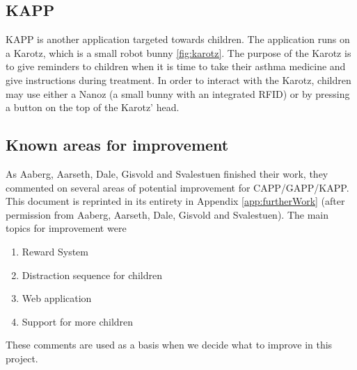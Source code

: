 

\subsection{KAPP}
KAPP is another application targeted towards children. The application runs on a Karotz\cite{karotz}, which is a small robot bunny \ref{fig:karotz}. The purpose of the Karotz is to give reminders to children when it is time to take their asthma medicine and give instructions during treatment. In order to interact with the Karotz, children may use either a Nanoz (a small bunny with an integrated RFID) or by pressing a button on the top of the Karotz' head.    



\subsection{Known areas for improvement}
\label{sec:improvements}
As Aaberg, Aarseth, Dale, Gisvold and Svalestuen finished their work, they commented on several areas of potential improvement for CAPP/GAPP/KAPP. This document is reprinted in its entirety in Appendix \ref{app:furtherWork} (after permission from Aaberg, Aarseth, Dale, Gisvold and Svalestuen). The main topics for improvement were
\begin{enumerate}
\item{Reward System}
\item{Distraction sequence for children}
\item{Web application}
\item{Support for more children}
\end{enumerate}

These comments are used as a basis when we decide what to improve in this project. 




